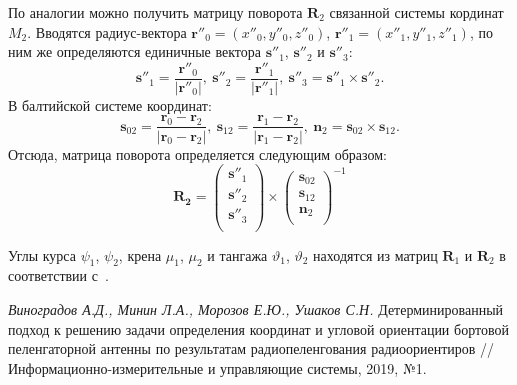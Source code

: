 \documentclass[a4paper,12pt]{article}
\begin{document}
По аналогии можно получить матрицу поворота $\mathbf{R}_2$ связанной системы
кординат $M_2$. Вводятся радиус-вектора $\mathbf{r}''_0 = \left(x''_0, y''_0, z''_0\right)$,
$\mathbf{r}''_1 = \left(x''_1, y''_1, z''_1\right)$, по ним же определяются единичные вектора
$\mathbf{s}''_1$, $\mathbf{s}''_2$ и $\mathbf{s}''_3$:
\begin{equation}
    \mathbf{s}''_1 = \frac{\mathbf{r}''_0}{|\mathbf{r}''_0|},\
    \mathbf{s}''_2 = \frac{\mathbf{r}''_1}{|\mathbf{r}''_1|},\
    \mathbf{s}''_3 = \mathbf{s}''_1 \times \mathbf{s}''_2.
\end{equation}
В балтийской системе координат:
\begin{equation}
    \mathbf{s}_{02} = \frac{\mathbf{r}_0 - \mathbf{r}_2}{|\mathbf{r}_0 - \mathbf{r}_2|},\
    \mathbf{s}_{12} = \frac{\mathbf{r}_1 - \mathbf{r}_2}{|\mathbf{r}_1 - \mathbf{r}_2|},\
    \mathbf{n}_2 = \mathbf{s}_{02} \times \mathbf{s}_{12}.
\end{equation}
Отсюда, матрица поворота определяется следующим образом:
\begin{equation}
    \mathbf{R_2} =
    \left(
    \begin{matrix}
        \mathbf{s}''_1 \\
        \mathbf{s}''_2 \\
        \mathbf{s}''_3 \\
    \end{matrix}
    \right) \times
    \left(
    \begin{matrix}
        \mathbf{s}_{02} \\
        \mathbf{s}_{12} \\
        \mathbf{n}_2 \\
    \end{matrix}
    \right)^{-1}
\end{equation}

Углы курса $\psi_1$, $\psi_2$, крена $\mu_1$, $\mu_2$ и тангажа $\vartheta_1$, $\vartheta_2$ находятся
из матриц $\mathbf{R}_1$ и $\mathbf{R}_2$ в соответствии с~\cite{antennas}.


\newpage
\begin{thebibliography}{9}
    \textit{Виноградов А.Д., Минин Л.А., Морозов Е.Ю., Ушаков С.Н.}
    Детерминированный подход к решению задачи определения координат и угловой
    ориентации бортовой пеленгаторной антенны по результатам радиопеленгования
    радиоориентиров // Информационно-измерительные и управляющие системы, 2019, №1.
\end{thebibliography}
\end{document}
